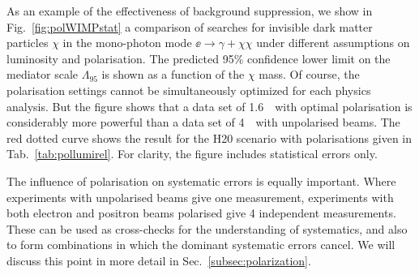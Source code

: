 As an example of the effectiveness of background suppression, we show in Fig.~\ref{fig:polWIMPstat} a comparison of searches  for invisible dark matter particles $\chi$  in the mono-photon  mode $\ee\to \gamma+ \chi\chi$ under different assumptions on luminosity and polarisation.   The predicted 95\% confidence lower limit on the mediator scale $\Lambda_{95}$ is shown as a function of 
the $\chi$ mass.  Of course, the polarisation settings cannot be simultaneously optimized for each physics analysis.  But the figure
shows that a data set of 1.6~\iab\ with optimal polarisation is considerably more powerful than a data set of 4~\iab\ with unpolarised
beams.  The red dotted curve shows the result for the H20 scenario with polarisations given in Tab.~\ref{tab:pollumirel}.   For clarity, the  figure includes statistical errors only. 

The influence of polarisation on systematic errors is equally important.  Where experiments with unpolarised beams give one measurement, experiments with both electron and positron beams polarised give 4 independent measurements.  These can be used as cross-checks for  the understanding of systematics, and also to form combinations in which the 
dominant systematic errors cancel.  We will 
discuss this point in more detail in Sec.~\ref{subsec:polarization}.